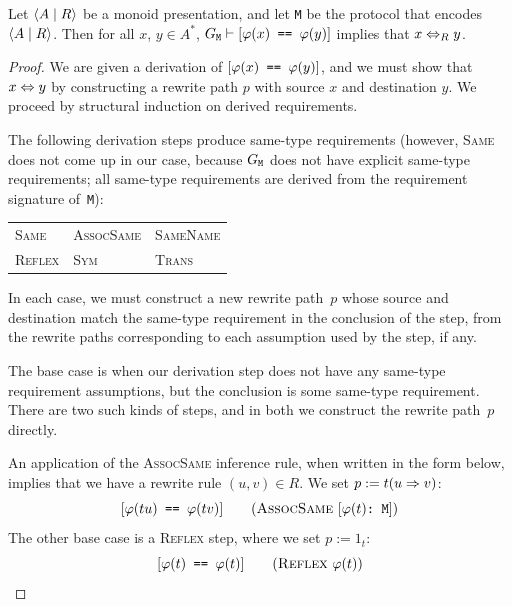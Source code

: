 \documentclass[../generics]{subfiles}
\begin{document}
\begin{theorem}\label{derivation to path}
Let $\langle A \mid R\rangle$ be a monoid presentation, and let \texttt{M} be the protocol that encodes $\langle A \mid R\rangle$. Then for all $x$, $y\in A^*$, $G_\texttt{M}\vdash[\texttt{$\varphi(x)$ == $\varphi(y)$}]$ implies that $x\Leftrightarrow_R y$.
\end{theorem}
\begin{proof}
We are given a derivation of $[\texttt{$\varphi(x)$ == $\varphi(y)$}]$, and we must show that $x\Leftrightarrow y$ by constructing a rewrite path $p$ with source $x$ and destination $y$. We proceed by structural induction on derived requirements.

The following derivation steps produce same-type requirements (however, \textsc{Same} does not come up in our case, because $G_\texttt{M}$ does not have explicit same-type requirements; all same-type requirements are derived from the requirement signature of~\texttt{M}):
\begin{center}
\begin{tabular}{lll}
\toprule
\textsc{Same}&\textsc{AssocSame}&\textsc{SameName}\\
\textsc{Reflex}&\textsc{Sym}&\textsc{Trans}\\
\bottomrule
\end{tabular}
\end{center}
In each case, we must construct a new rewrite path~$p$ whose source and destination match the same-type requirement in the conclusion of the step, from the rewrite paths corresponding to each assumption used by the step, if any.

\BaseCase The base case is when our derivation step does not have any same-type requirement assumptions, but the conclusion is some same-type requirement. There are two such kinds of steps, and in both we construct the rewrite path~$p$ directly.

An application of the \textsc{AssocSame} inference rule, when written in the form below, implies that we have a rewrite rule $(u,v)\in R$. We set $p:=t(u\Rightarrow v)$:
\[\SameReqPhi{tu}{tv}\tag{\textsc{AssocSame} $\ConfReqPhi{t}$}\]
The other base case is a \textsc{Reflex} step, where we set $p:=1_t$:
\[\SameReqPhi{t}{t}\tag{\textsc{Reflex} $\varphi(t)$}\]


\end{proof}
\end{document}
